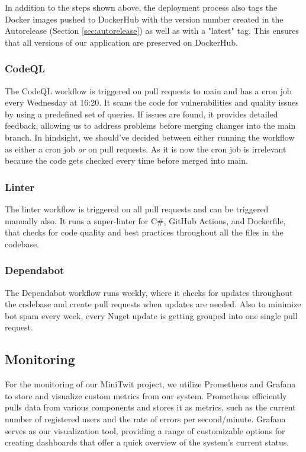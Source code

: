 In addition to the steps shown above, the deployment process also tags the Docker images pushed to DockerHub with the version number created in the Autorelease (Section \ref{sec:autorelease}) as well as with a "latest" tag. This ensures that all versions of our application are preserved on DockerHub.

\subsubsection*{CodeQL}
The CodeQL workflow is triggered on pull requests to main and has a cron job every Wednesday at 16:20. It scans the code for vulnerabilities and quality issues by using a predefined set of queries. If issues are found, it provides detailed feedback, allowing us to address problems before merging changes into the main branch.
In hindsight, we should've decided between either running the workflow as either a cron job \textit{or} on pull requests. As it is now the cron job is irrelevant because the code gets checked every time before merged into main.

\subsubsection*{Linter}
The linter workflow is triggered on all pull requests and can be triggered manually also. It runs a super-linter for C\#, GitHub Actions, and Dockerfile, that checks for code quality and best practices throughout all the files in the codebase.

\subsubsection*{Dependabot}
The Dependabot workflow runs weekly, where it checks for updates throughout the codebase and create pull requests when updates are needed. Also to minimize bot spam every week, every Nuget update is getting grouped into one single pull request.


\subsection{Monitoring} %
For the monitoring of our MiniTwit project, we utilize Prometheus and Grafana to store and visualize custom metrics from our system. Prometheus efficiently pulls data from various components and stores it as metrics, such as the current number of registered users and the rate of errors per second/minute. Grafana serves as our visualization tool, providing a range of customizable options for creating dashboards that offer a quick overview of the system's current status. \\

